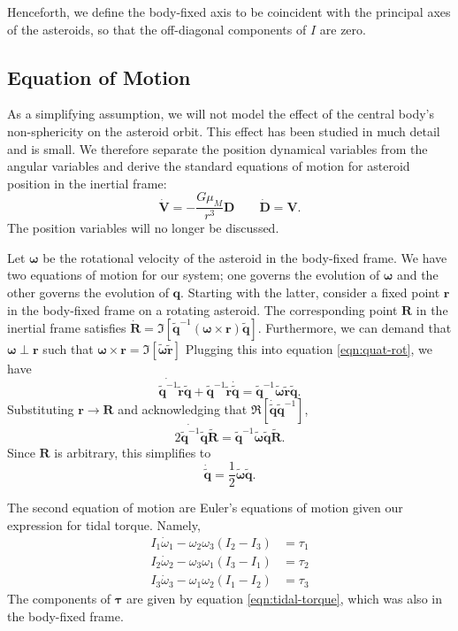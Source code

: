 \documentclass[linenumbers]{aastex631}
\newcommand{\quat}[1]{\widetilde{\mathbf{#1}}}
\begin{document}
Henceforth, we define the body-fixed axis to be coincident with the principal axes of the asteroids, so that the off-diagonal components of $I$ are zero.

\subsection{Equation of Motion}
As a simplifying assumption, we will not model the effect of the central body's non-sphericity on the asteroid orbit. This effect has been studied in much detail and is small. We therefore separate the position dynamical variables from the angular variables and derive the standard equations of motion for asteroid position in the inertial frame:
\begin{equation}
\dot{\mathbf{V}} = -\frac{G\mu_M}{r^3}\mathbf{D}\qquad \dot{\mathbf{D}} = \mathbf{V}.
\label{eqn:translaton-eom}
\end{equation}
The position variables will no longer be discussed.

Let $\mathbf\omega$ be the rotational velocity of the asteroid in the body-fixed frame. We have two equations of motion for our system; one governs the evolution of $\mathbf \omega$ and the other governs the evolution of $\mathbf q$. Starting with the latter, consider a fixed point $\mathbf r$ in the body-fixed frame on a rotating asteroid. The corresponding point $\mathbf R$ in the inertial frame satisfies $\dot{\mathbf R} = \Im[\quat q^{-1}(\mathbf \omega \times \mathbf r )\quat q]$. Furthermore, we can demand that $\mathbf \omega \perp \mathbf r$ such that $\mathbf \omega \times \mathbf r = \Im[\quat \omega \quat r]$ Plugging this into equation \ref{eqn:quat-rot}, we have
\begin{equation}
\dot{\quat q^{-1}} \quat r \quat q + \quat q^{-1} \quat r \dot{\quat q} = \quat q^{-1}\quat \omega \quat r \quat q.
\nonumber
\end{equation}
Substituting $\mathbf r \rightarrow \mathbf R$ and acknowledging that $\Re[\dot{\quat q} \quat q^{-1}]$,
\begin{equation}
2\dot{\quat q^{-1}}\quat q\quat R = \quat q^{-1}\quat \omega \quat q \quat R.
\nonumber
\end{equation}
Since $\mathbf R$ is arbitrary, this simplifies to
\begin{equation}
\dot{\quat q} = \frac{1}{2}\quat \omega\quat q.
\label{eqn:quat-eom}
\end{equation}

The second equation of motion are Euler's equations of motion given our expression for tidal torque. Namely,
\begin{eqnarray}
I_1 \dot \omega_1 - \omega_2 \omega_3 (I_2 - I_3) &= \tau_1\\
I_2 \dot \omega_2 - \omega_3 \omega_1 (I_3 - I_1) &= \tau_2\\
I_3 \dot \omega_3 - \omega_1 \omega_2 (I_1 - I_2) &= \tau_3
\label{eqn:omega-eom}
\end{eqnarray}
The components of $\mathbf \tau$ are given by equation \ref{eqn:tidal-torque}, which was also in the body-fixed frame.
\end{document}
